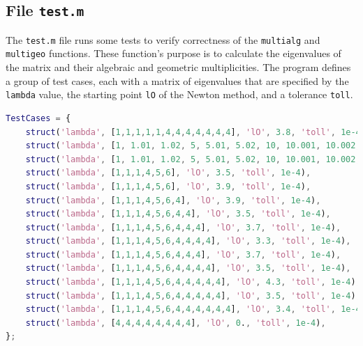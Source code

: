 \documentclass[12pt]{article}
\begin{document}
    \subsection{File \texttt{test.m}}
    The \texttt{test.m} file runs some tests to verify correctness of the  \texttt{multialg} and \texttt{multigeo} functions. These function's purpose is to calculate the eigenvalues of the matrix and their algebraic and geometric multiplicities.
    The program defines a group of test cases, each with a matrix of eigenvalues that are specified by the \texttt{lambda} value, the starting point \texttt{lO} of the Newton method, and a tolerance \texttt{toll}.
    \begin{lstlisting}[language=Matlab, frame=single, caption={Test Cases}, captionpos=b]         
TestCases = {
    struct('lambda', [1,1,1,1,1,4,4,4,4,4,4,4], 'lO', 3.8, 'toll', 1e-4),
    struct('lambda', [1, 1.01, 1.02, 5, 5.01, 5.02, 10, 10.001, 10.002, 10.003], 'lO', 10.1, 'toll', 1e-4),
    struct('lambda', [1, 1.01, 1.02, 5, 5.01, 5.02, 10, 10.001, 10.002, 10.003], 'lO', 1.0125, 'toll', 1e-4),
    struct('lambda', [1,1,1,4,5,6], 'lO', 3.5, 'toll', 1e-4),
    struct('lambda', [1,1,1,4,5,6], 'lO', 3.9, 'toll', 1e-4),
    struct('lambda', [1,1,1,4,5,6,4], 'lO', 3.9, 'toll', 1e-4),
    struct('lambda', [1,1,1,4,5,6,4,4], 'lO', 3.5, 'toll', 1e-4),
    struct('lambda', [1,1,1,4,5,6,4,4,4], 'lO', 3.7, 'toll', 1e-4), 
    struct('lambda', [1,1,1,4,5,6,4,4,4,4], 'lO', 3.3, 'toll', 1e-4), 
    struct('lambda', [1,1,1,4,5,6,4,4,4], 'lO', 3.7, 'toll', 1e-4),
    struct('lambda', [1,1,1,4,5,6,4,4,4,4], 'lO', 3.5, 'toll', 1e-4),
    struct('lambda', [1,1,1,4,5,6,4,4,4,4,4], 'lO', 4.3, 'toll', 1e-4), 
    struct('lambda', [1,1,1,4,5,6,4,4,4,4,4], 'lO', 3.5, 'toll', 1e-4), 
    struct('lambda', [1,1,1,4,5,6,4,4,4,4,4,4], 'lO', 3.4, 'toll', 1e-4),
    struct('lambda', [4,4,4,4,4,4,4,4], 'lO', 0., 'toll', 1e-4),
};
    \end{lstlisting}
    \newpage
\end{document}
